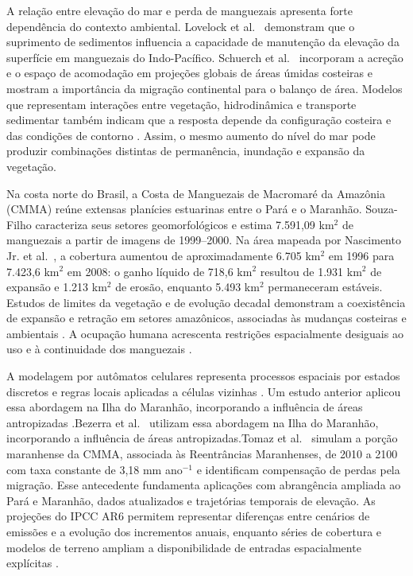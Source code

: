 \documentclass[12pt,a4paper]{article}
\begin{document}
A relação entre elevação do mar e perda de manguezais apresenta forte dependência do contexto ambiental. Lovelock et al.\ \citeyearpar{lovelock2015} demonstram que o suprimento de sedimentos influencia a capacidade de manutenção da elevação da superfície em manguezais do Indo-Pacífico. Schuerch et al.\ \citeyearpar{schuerch2018} incorporam a acreção e o espaço de acomodação em projeções globais de áreas úmidas costeiras e mostram a importância da migração continental para o balanço de área. Modelos que representam interações entre vegetação, hidrodinâmica e transporte sedimentar também indicam que a resposta depende da configuração costeira e das condições de contorno \citep{xie2022}. Assim, o mesmo aumento do nível do mar pode produzir combinações distintas de permanência, inundação e expansão da vegetação.

Na costa norte do Brasil, a Costa de Manguezais de Macromaré da Amazônia (CMMA) reúne extensas planícies estuarinas entre o Pará e o Maranhão. Souza-Filho \citeyearpar{souzafilho2005} caracteriza seus setores geomorfológicos e estima 7.591,09 km$^2$ de manguezais a partir de imagens de 1999--2000. Na área mapeada por Nascimento Jr. et al.\ \citeyearpar{nascimento2013}, a cobertura aumentou de aproximadamente 6.705 km$^2$ em 1996 para 7.423,6 km$^2$ em 2008: o ganho líquido de 718,6 km$^2$ resultou de 1.931 km$^2$ de expansão e 1.213 km$^2$ de erosão, enquanto 5.493 km$^2$ permaneceram estáveis. Estudos de limites da vegetação e de evolução decadal demonstram a coexistência de expansão e retração em setores amazônicos, associadas às mudanças costeiras e ambientais \citep{cohen2003,cohen2018}. A ocupação humana acrescenta restrições espacialmente desiguais ao uso e à continuidade dos manguezais \citep{hayashi2019}.

A modelagem por autômatos celulares representa processos espaciais por estados discretos e regras locais aplicadas a células vizinhas \citep{engelen1995}. \ifdefined\VersaoCega Um estudo anterior aplicou essa abordagem na Ilha do Maranhão, incorporando a influência de áreas antropizadas \citeyearpar{bezerra2014}.\else Bezerra et al.\ \citeyearpar{bezerra2014} utilizam essa abordagem na Ilha do Maranhão, incorporando a influência de áreas antropizadas.\fi\space Tomaz et al.\ \citeyearpar{tomaz2019} simulam a porção maranhense da CMMA, associada às Reentrâncias Maranhenses, de 2010 a 2100 com taxa constante de 3,18 mm ano$^{-1}$ e identificam compensação de perdas pela migração. Esse antecedente fundamenta aplicações com abrangência ampliada ao Pará e Maranhão, dados atualizados e trajetórias temporais de elevação. As projeções do IPCC AR6 permitem representar diferenças entre cenários de emissões e a evolução dos incrementos anuais, enquanto séries de cobertura e modelos de terreno ampliam a disponibilidade de entradas espacialmente explícitas \citep{garner2021,kopp2023,laipelt2024,mapbiomas2026}.
\end{document}
